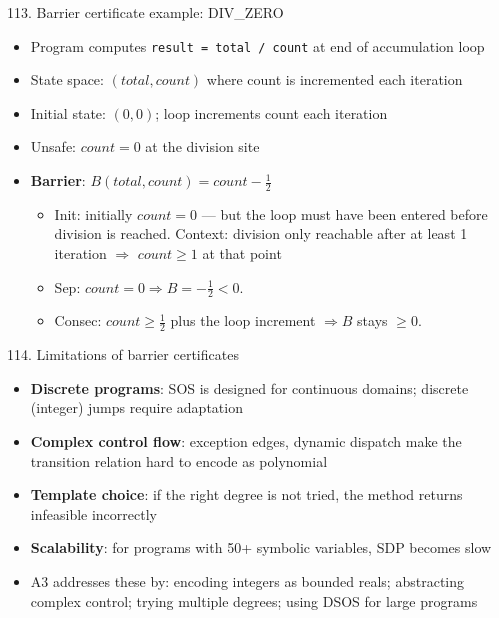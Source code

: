 \documentclass[aspectratio=169]{beamer}
\begin{document}
\begin{frame}{113. Barrier certificate example: DIV\_ZERO}
\begin{itemize}
  \item Program computes \texttt{result = total / count} at end of accumulation loop
  \item State space: \((total, count)\) where count is incremented each iteration
  \item Initial state: \((0, 0)\); loop increments count each iteration
  \item Unsafe: \(count = 0\) at the division site
  \item \textbf{Barrier}: \(B(total, count) = count - \tfrac{1}{2}\)
    \begin{itemize}
      \item Init: initially \(count = 0\) --- but the loop must have been entered before division is reached. Context: division only reachable after at least 1 iteration $\Rightarrow$ \(count \ge 1\) at that point
      \item Sep: \(count = 0 \Rightarrow B = -\tfrac{1}{2} < 0\). \checkmark
      \item Consec: \(count \ge \tfrac{1}{2}\) plus the loop increment $\Rightarrow B$ stays $\ge 0$. \checkmark
    \end{itemize}
\end{itemize}
\end{frame}

\begin{frame}{114. Limitations of barrier certificates}
\begin{itemize}
  \item \textbf{Discrete programs}: SOS is designed for continuous domains; discrete (integer) jumps require adaptation
  \item \textbf{Complex control flow}: exception edges, dynamic dispatch make the transition relation hard to encode as polynomial
  \item \textbf{Template choice}: if the right degree is not tried, the method returns infeasible incorrectly
  \item \textbf{Scalability}: for programs with 50+ symbolic variables, SDP becomes slow
  \item A3 addresses these by: encoding integers as bounded reals; abstracting complex control; trying multiple degrees; using DSOS for large programs
\end{itemize}
\end{frame}
\end{document}
